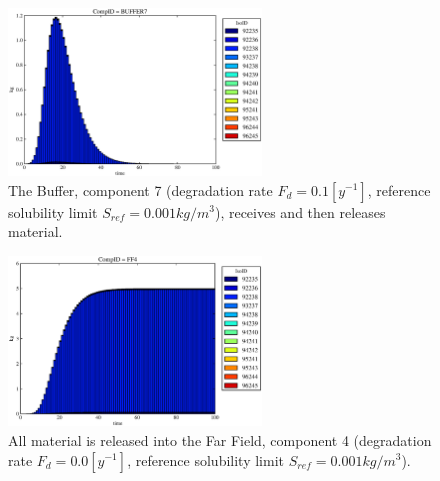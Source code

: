 \begin{figure}[ht]
\centering
  \includegraphics[width=0.6\textwidth]{./results/images/mcIII3.eps}
  \caption[Case MCIII Buffer Contaminants]{
          The Buffer, component 7 (degradation rate $F_d=0.1[y^{-1}]$, reference solubility 
        limit $S_{ref}=0.001kg/m^3$), receives and then releases material.
    }
  \label{fig:mcIIIbuff}
\end{figure}

\begin{figure}[ht]
\centering
  \includegraphics[width=0.6\textwidth]{./results/images/mcIII0.eps}
  \caption[Case MCIII Far Field Contaminants.]{All material is released into
        the Far Field, component 4 (degradation rate $F_d=0.0[y^{-1}]$, reference solubility limit $S_{ref} = 0.001kg/m^3$).}
  \label{fig:mcIII}
\end{figure}

